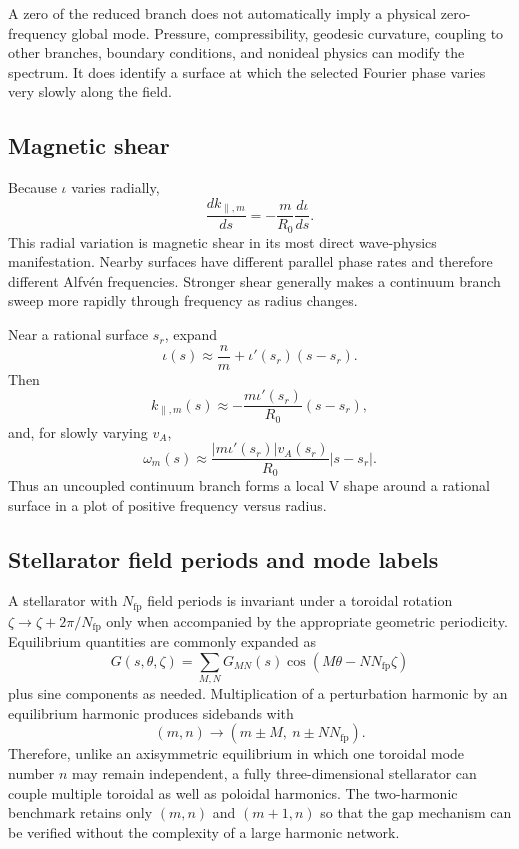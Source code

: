 A zero of the reduced branch does not automatically imply a physical zero-frequency global mode. Pressure, compressibility, geodesic curvature, coupling to other branches, boundary conditions, and nonideal physics can modify the spectrum. It does identify a surface at which the selected Fourier phase varies very slowly along the field.

\subsection{Magnetic shear}
Because $\iota$ varies radially,
\begin{equation}
\frac{dk_{\parallel,m}}{ds}=-\frac{m}{R_0}\frac{d\iota}{ds}.
\label{eq:kparallel_shear}
\end{equation}
This radial variation is magnetic shear in its most direct wave-physics manifestation. Nearby surfaces have different parallel phase rates and therefore different Alfv\'en frequencies. Stronger shear generally makes a continuum branch sweep more rapidly through frequency as radius changes.

Near a rational surface $s_r$, expand
\begin{equation}
\iota(s)\approx\frac{n}{m}+\iota'(s_r)(s-s_r).
\end{equation}
Then
\begin{equation}
k_{\parallel,m}(s)\approx-\frac{m\iota'(s_r)}{R_0}(s-s_r),
\end{equation}
and, for slowly varying $v_A$,
\begin{equation}
\omega_m(s)\approx\frac{|m\iota'(s_r)|v_A(s_r)}{R_0}|s-s_r|.
\end{equation}
Thus an uncoupled continuum branch forms a local V shape around a rational surface in a plot of positive frequency versus radius.

\subsection{Stellarator field periods and mode labels}
A stellarator with $N_{\mathrm{fp}}$ field periods is invariant under a toroidal rotation $\zeta\rightarrow\zeta+2\pi/N_{\mathrm{fp}}$ only when accompanied by the appropriate geometric periodicity. Equilibrium quantities are commonly expanded as
\begin{equation}
G(s,\theta,\zeta)=\sum_{M,N}G_{MN}(s)
\cos\!\left(M\theta-NN_{\mathrm{fp}}\zeta\right)
\end{equation}
plus sine components as needed. Multiplication of a perturbation harmonic by an equilibrium harmonic produces sidebands with
\begin{equation}
(m,n)\longrightarrow(m\pm M,\ n\pm NN_{\mathrm{fp}}).
\label{eq:stellarator_selection_rule}
\end{equation}
Therefore, unlike an axisymmetric equilibrium in which one toroidal mode number $n$ may remain independent, a fully three-dimensional stellarator can couple multiple toroidal as well as poloidal harmonics. The two-harmonic benchmark retains only $(m,n)$ and $(m+1,n)$ so that the gap mechanism can be verified without the complexity of a large harmonic network.


